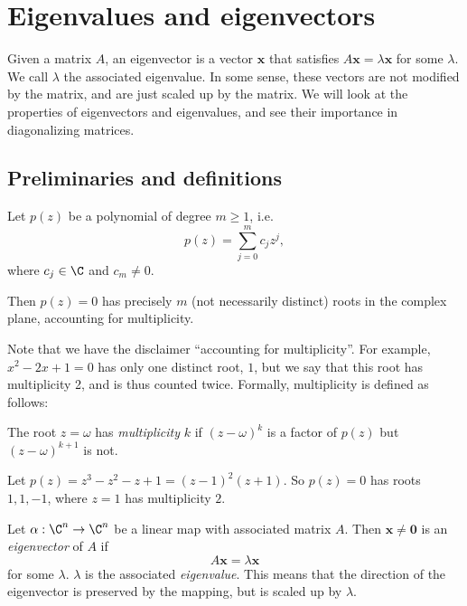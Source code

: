 \documentclass[a4paper]{article}
\begin{document}
\section{Eigenvalues and eigenvectors}
\label{sec:eigen}
Given a matrix $A$, an eigenvector is a vector $\mathbf{x}$ that satisfies $A\mathbf{x} = \lambda \mathbf{x}$ for some $\lambda$. We call $\lambda$ the associated eigenvalue. In some sense, these vectors are not modified by the matrix, and are just scaled up by the matrix. We will look at the properties of eigenvectors and eigenvalues, and see their importance in diagonalizing matrices.

\subsection{Preliminaries and definitions}
\begin{thm}
  Let $p(z)$ be a polynomial of degree $m \geq 1$, i.e.
  \[
    p(z) = \sum_{j = 0}^m c_jz^j,
  \]
  where $c_j\in \C$ and $c_m \not= 0$.

  Then $p(z) = 0$ has precisely $m$ (not necessarily distinct) roots in the complex plane, accounting for multiplicity.
\end{thm}
Note that we have the disclaimer ``accounting for multiplicity''. For example, $x^2 - 2x + 1 = 0$ has only one distinct root, $1$, but we say that this root has multiplicity 2, and is thus counted twice. Formally, multiplicity is defined as follows:

\begin{defi}
  The root $z = \omega$ has \emph{multiplicity} $k$ if $(z - \omega)^k$ is a factor of $p(z)$ but $(z - \omega)^{k + 1}$ is not.
\end{defi}

\begin{eg}
  Let $p(z) = z^3 - z^2 - z + 1 = (z - 1)^2(z + 1)$. So $p(z) = 0$ has roots $1, 1, -1$, where $z = 1$ has multiplicity $2$.
\end{eg}

\begin{defi}
  Let $\alpha: \C^n\to \C^n$ be a linear map with associated matrix $A$. Then $\mathbf{x}\not= \mathbf{0}$ is an \emph{eigenvector} of $A$ if
  \[
    A\mathbf{x} = \lambda\mathbf{x}
  \]
  for some $\lambda$. $\lambda$ is the associated \emph{eigenvalue}. This means that the direction of the eigenvector is preserved by the mapping, but is scaled up by $\lambda$.
\end{defi}
\end{document}
